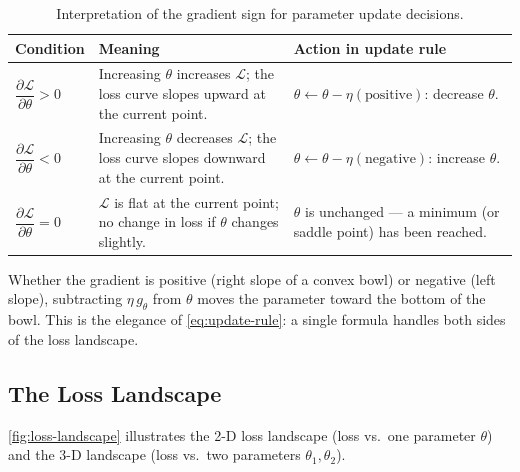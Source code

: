 \documentclass[12pt,a4paper]{article}
\newcommand{\Loss}{\mathcal{L}}
\newcommand{\pderiv}[2]{\dfrac{\partial #1}{\partial #2}}
\begin{document}
\begin{table}[ht]
\centering
\caption{Interpretation of the gradient sign for parameter update decisions.}
\label{tab:gradient-sign}
\begin{tabular}{p{3.5cm}p{5.5cm}p{4cm}}
\toprule
\textbf{Condition} & \textbf{Meaning} & \textbf{Action in update rule} \\
\midrule
$\pderiv{\Loss}{\theta} > 0$ &
  Increasing $\theta$ increases $\Loss$; the loss curve slopes upward at the
  current point. &
  $\theta \leftarrow \theta - \eta(\text{positive})$: decrease $\theta$. \\[6pt]
$\pderiv{\Loss}{\theta} < 0$ &
  Increasing $\theta$ decreases $\Loss$; the loss curve slopes downward at
  the current point. &
  $\theta \leftarrow \theta - \eta(\text{negative})$: increase $\theta$. \\[6pt]
$\pderiv{\Loss}{\theta} = 0$ &
  $\Loss$ is flat at the current point; no change in loss if $\theta$
  changes slightly. &
  $\theta$ is unchanged --- a minimum (or saddle point) has been reached. \\
\bottomrule
\end{tabular}
\end{table}

\begin{keyinsight}[title=The update rule always moves downhill]
Whether the gradient is positive (right slope of a convex bowl) or
negative (left slope), subtracting $\eta\,g_\theta$ from $\theta$ moves the
parameter toward the bottom of the bowl.
This is the elegance of \cref{eq:update-rule}: a single formula handles
both sides of the loss landscape.
\end{keyinsight}

\subsection{The Loss Landscape}

\cref{fig:loss-landscape} illustrates the 2-D loss landscape (loss vs.\
one parameter $\theta$) and the 3-D landscape (loss vs.\ two parameters
$\theta_1, \theta_2$).
\end{document}
